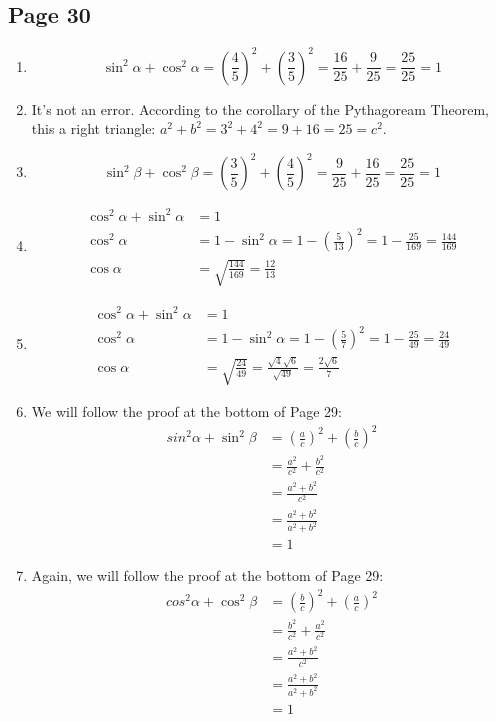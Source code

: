\documentclass{article}
\newenvironment{solutions}[1]
{\subsection*{#1}
 \begin{enumerate}[leftmargin=1.5em]}
{\end{enumerate}}
\newcommand{\solution}{\item}
\begin{document}
\begin{solutions}{Page 30}
\solution %
\begin{equation*}
\sin^{2}{\alpha} + \cos^{2}{\alpha} = \left(\frac{4}{5}\right)^2 + \left(\frac{3}{5}\right)^2 = \frac{16}{25} + \frac{9}{25} = \frac{25}{25} = 1
\end{equation*}

\solution %
It's not an error. According to the corollary of the Pythagoream Theorem, this a right triangle: $a^2 + b^2 = 3^2 + 4^2 = 9 + 16 = 25 = c^2$.

\solution %
\begin{equation*}
\sin^{2}{\beta} + \cos^{2}{\beta} = \left(\frac{3}{5}\right)^2 + \left(\frac{4}{5}\right)^2 = \frac{9}{25} + \frac{16}{25} = \frac{25}{25} = 1
\end{equation*}

\solution %
\begin{align*}
\cos^2{\alpha} + \sin^{2}{\alpha} &= 1 \\
\cos^2{\alpha} &= 1 - \sin^{2}{\alpha} = 1- \left(\frac{5}{13}\right)^2 = 1 - \frac{25}{169} = \frac{144}{169} \\
\cos{\alpha} &= \sqrt{\frac{144}{169}} = \frac{12}{13} 
\end{align*}

\solution %
\begin{align*}
\cos^2{\alpha} + \sin^{2}{\alpha} &= 1 \\
\cos^2{\alpha} &= 1 - \sin^{2}{\alpha} = 1- \left(\frac{5}{7}\right)^2 = 1 - \frac{25}{49} = \frac{24}{49} \\
\cos{\alpha} &= \sqrt{\frac{24}{49}} = \frac{\sqrt{4}\sqrt{6}}{\sqrt{49}} = \frac{2\sqrt{6}}{7}
\end{align*}

\solution %
We will follow the proof at the bottom of Page 29:
\begin{align*}
sin^{2}{\alpha} + \sin^{2}{\beta} &= \left(\frac{a}{c}\right)^2 + \left(\frac{b}{c}\right)^2 \\
&= \frac{a^2}{c^2} + \frac{b^2}{c^2} \\
&= \frac{a^2 + b^2}{c^2} \\
&= \frac{a^2 + b^2}{a^2 + b^2} \\
&= 1
\end{align*}

\solution %
Again, we will follow the proof at the bottom of Page 29:
\begin{align*}
cos^{2}{\alpha} + \cos^{2}{\beta} &= \left(\frac{b}{c}\right)^2 + \left(\frac{a}{c}\right)^2 \\
&= \frac{b^2}{c^2} + \frac{a^2}{c^2} \\
&= \frac{a^2 + b^2}{c^2} \\
&= \frac{a^2 + b^2}{a^2 + b^2} \\
&= 1
\end{align*}
\end{solutions}
\end{document}
